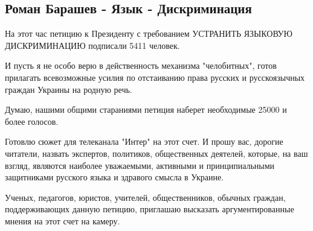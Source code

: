  
 
 

\subsection{Роман Барашев - Язык - Дискриминация}

На этот час петицию к Президенту с требованием УСТРАНИТЬ ЯЗЫКОВУЮ ДИСКРИМИНАЦИЮ
подписали 5411 человек.

И пусть я не особо верю в действенность механизма "челобитных", готов прилагать
всевозможные усилия по отстаиванию права русских и русскоязычных граждан
Украины на родную речь.

Думаю, нашими общими стараниями петиция наберет необходимые 25000 и более
голосов.

Готовлю сюжет для телеканала "Интер" на этот счет. И прошу вас, дорогие
читатели, назвать экспертов, политиков, общественных деятелей, которые, на ваш
взгляд, являются наиболее уважаемыми, активными и принципиальными защитниками
русского языка и здравого смысла в Украине. 

Ученых, педагогов, юристов, учителей, общественников, обычных граждан,
поддерживающих данную петицию, приглашаю высказать аргументированные мнения на
этот счет на камеру.

